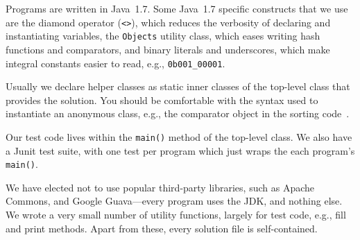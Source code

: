 \documentclass[10pt,openany,twoside,letterpaper,extrafontsizes]{memoir}
\newif\ifJava
\begin{document}
\begin{Spacing}{\gettingReadySpacing}
\ifJava
\noindent
Programs are written in Java~1.7.
Some Java~1.7 specific constructs that we use are
the diamond operator (\texttt{<>}), which reduces the verbosity of declaring and instantiating  variables,
the \texttt{Objects} utility class, which eases writing hash functions and comparators,
and binary literals and underscores, which make integral constants easier to read, e.g., \texttt{0b001\_00001}.

Usually we declare helper classes as static inner classes of
the top-level class that provides the solution.
You should be comfortable with the syntax used to instantiate
an anonymous class, e.g., the comparator object in the
sorting code~.

Our test code lives within the \texttt{main()} method of the top-level class.
We also have a Junit test suite, with one test per program which just wraps the
each program's \texttt{main()}.

We have elected not to use popular third-party libraries, such as Apache Commons,
and Google Guava---every program uses the JDK, and nothing else.
We wrote a very small number of utility functions, largely
for test code, e.g., fill and print methods. Apart from these,
every solution file is self-contained.



\end{Spacing}
\end{document}
